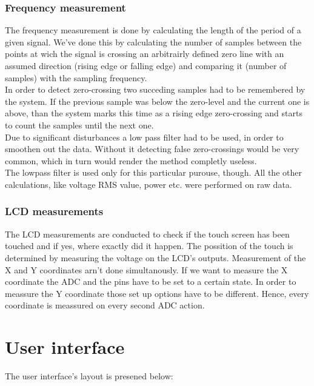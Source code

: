 \subsubsection{Frequency measurement}
The frequency measurement is done by calculating the length of the period of a given signal. We've done this by calculating the number of samples between the points at wich the signal is crossing an arbitrairly defined zero line with an assumed direction (rising edge or falling edge) and comparing it (number of samples) with the sampling frequency.\\
In order to detect zero-crossing two succeding samples had to be remembered by the system. If the previous sample was below the zero-level and the current one is above, than the system marks this time as a rising edge zero-crossing and starts to count the samples until the next one.\\
Due to significant disturbances a low pass filter had to be used, in order to smoothen out the data. Without it detecting false zero-crossings would be very common, which in turn would render the method completly useless.\\
The lowpass filter is used only for this particular purouse, though. All the other calculations, like voltage RMS value, power etc. were performed on raw data.

\subsubsection{LCD measurements}
The LCD measurements are conducted to check if the touch screen has been touched and if yes, where exactly did it happen. The possition of the touch is determined by measuring the voltage on the LCD's outputs. Measurement of the X and Y coordinates arn't done simultanously. If we want to measure the X coordinate the ADC and the pins have to be set to a certain state. In order to meassure the Y coordinate those set up options have to be different. Hence, every coordinate is meassured on every second ADC action.

 
\section{User interface}
The user interface's layout is presened below:


